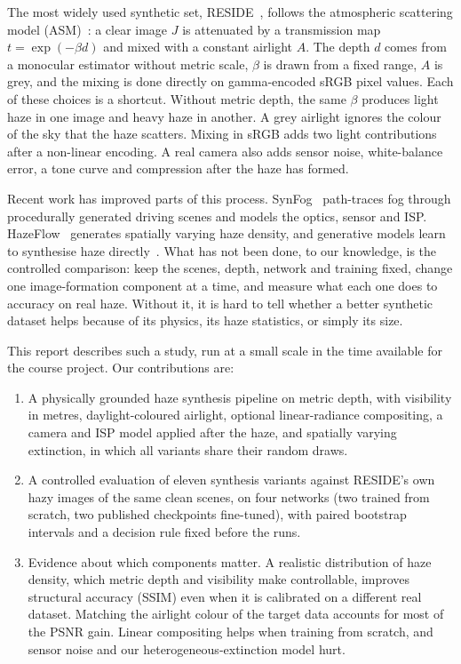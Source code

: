 \documentclass{article}
\begin{document}
The most widely used synthetic set, RESIDE~\cite{li2019reside}, follows the atmospheric scattering model (ASM)~\cite{koschmieder1924,narasimhan2002vision}: a clear image $J$ is attenuated by a transmission map $t=\exp(-\beta d)$ and mixed with a constant airlight $A$. The depth $d$ comes from a monocular estimator without metric scale, $\beta$ is drawn from a fixed range, $A$ is grey, and the mixing is done directly on gamma-encoded sRGB pixel values. Each of these choices is a shortcut. Without metric depth, the same $\beta$ produces light haze in one image and heavy haze in another. A grey airlight ignores the colour of the sky that the haze scatters. Mixing in sRGB adds two light contributions after a non-linear encoding. A real camera also adds sensor noise, white-balance error, a tone curve and compression after the haze has formed.

Recent work has improved parts of this process. SynFog~\cite{xie2024synfog} path-traces fog through procedurally generated driving scenes and models the optics, sensor and ISP. HazeFlow~\cite{shin2025hazeflow} generates spatially varying haze density, and generative models learn to synthesise haze directly~\cite{wang2025hazegen}. What has not been done, to our knowledge, is the controlled comparison: keep the scenes, depth, network and training fixed, change one image-formation component at a time, and measure what each one does to accuracy on real haze. Without it, it is hard to tell whether a better synthetic dataset helps because of its physics, its haze statistics, or simply its size.

This report describes such a study, run at a small scale in the time available for the course project. Our contributions are:
\begin{enumerate}
\item A physically grounded haze synthesis pipeline on metric depth, with visibility in metres, daylight-coloured airlight, optional linear-radiance compositing, a camera and ISP model applied after the haze, and spatially varying extinction, in which all variants share their random draws.
\item A controlled evaluation of eleven synthesis variants against RESIDE's own hazy images of the same clean scenes, on four networks (two trained from scratch, two published checkpoints fine-tuned), with paired bootstrap intervals and a decision rule fixed before the runs.
\item Evidence about which components matter. A realistic distribution of haze density, which metric depth and visibility make controllable, improves structural accuracy (SSIM) even when it is calibrated on a different real dataset. Matching the airlight colour of the target data accounts for most of the PSNR gain. Linear compositing helps when training from scratch, and sensor noise and our heterogeneous-extinction model hurt.
\end{enumerate}
\end{document}
